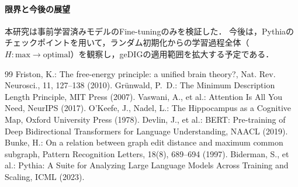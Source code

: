\paragraph{限界と今後の展望}
本研究は事前学習済みモデルのFine-tuningのみを検証した．
今後は，Pythia\cite{biderman2023}のチェックポイントを用いて，ランダム初期化からの学習過程全体（$H: \mathrm{max} \to \mathrm{optimal}$）を観察し，geDIGの適用範囲を拡大する予定である．

\begin{thebibliography}{99}
 Friston, K.: The free-energy principle: a unified brain theory?, Nat. Rev. Neurosci., 11, 127--138 (2010).
 Gr\"{u}nwald, P.~D.: The Minimum Description Length Principle, MIT Press (2007).
 Vaswani, A., et al.: Attention Is All You Need, NeurIPS (2017).
 O'Keefe, J., Nadel, L.: The Hippocampus as a Cognitive Map, Oxford University Press (1978).
 Devlin, J., et al.: BERT: Pre-training of Deep Bidirectional Transformers for Language Understanding, NAACL (2019).
 Bunke, H.: On a relation between graph edit distance and maximum common subgraph, Pattern Recognition Letters, 18(8), 689--694 (1997).
 Biderman, S., et al.: Pythia: A Suite for Analyzing Large Language Models Across Training and Scaling, ICML (2023).

\end{thebibliography}


